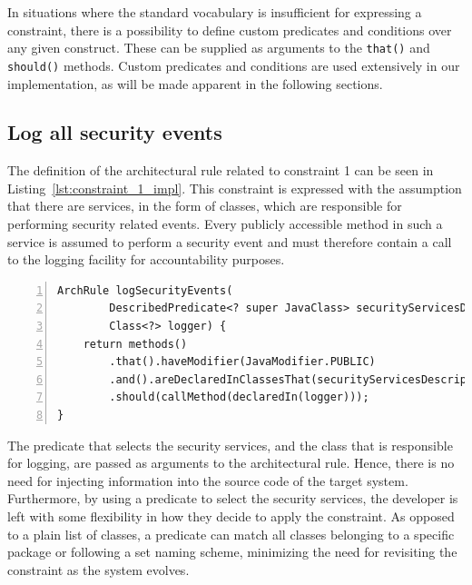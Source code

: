 
In situations where the standard vocabulary is insufficient for expressing a constraint, there is a possibility to define custom predicates and conditions over any given construct. These can be supplied as arguments to the \texttt{that()} and \texttt{should()} methods. Custom predicates and conditions are used extensively in our implementation, as will be made apparent in the following sections.

\subsection{Log all security events}
The definition of the architectural rule related to constraint 1 can be seen in Listing~\ref{lst:constraint_1_impl}. This constraint is expressed with the assumption that there are services, in the form of classes, which are responsible for performing security related events. Every publicly accessible method in such a service is assumed to perform a security event and must therefore contain a call to the logging facility for accountability purposes.

\begin{minipage}{\linewidth}
\begin{lstlisting}[caption={Rule definition for constraint 1.}, captionpos=b, label=lst:constraint_1_impl, numbers=left]
ArchRule logSecurityEvents(
        DescribedPredicate<? super JavaClass> securityServicesDescriptor,
        Class<?> logger) {
    return methods()
        .that().haveModifier(JavaModifier.PUBLIC)
        .and().areDeclaredInClassesThat(securityServicesDescriptor)
        .should(callMethod(declaredIn(logger)));
}
\end{lstlisting}
\end{minipage}

The predicate that selects the security services, and the class that is responsible for logging, are passed as arguments to the architectural rule. Hence, there is no need for injecting information into the source code of the target system. Furthermore, by using a predicate to select the security services, the developer is left with some flexibility in how they decide to apply the constraint. As opposed to a plain list of classes, a predicate can match all classes belonging to a specific package or following a set naming scheme, minimizing the need for revisiting the constraint as the system evolves.

